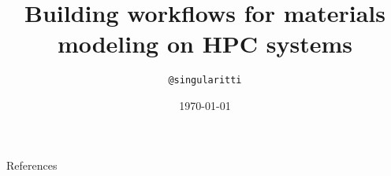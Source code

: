 \documentclass[aspectratio=1610]{beamer}
\title{Building workflows for materials modeling on HPC systems}
\subtitle{}
\author{\texttt{@singularitti}}
\institute{}
\date{\today}
\begin{document}
\begin{frame}
    \maketitle
\end{frame}

\begin{frame}
    \tableofcontents
\end{frame}




\begin{frame}{References}
    \printbibliography
\end{frame}
\end{document}
